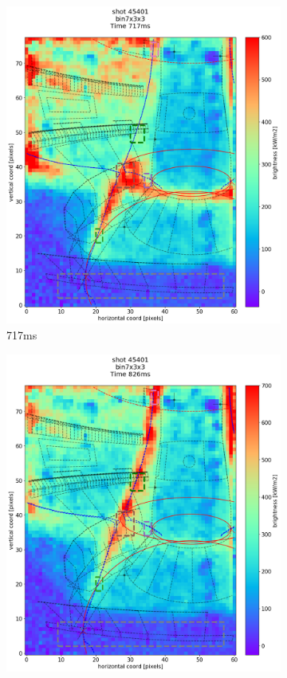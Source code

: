 \begin{figure}[!ht]
\begin{subfigure}{0.355\linewidth}
         \includegraphics[trim={50 0 25 80},clip,width=\textwidth]{Chapters/chapter2/figs/IRVB-MASTU_shot-45401_export_64.png}
         \caption{717ms}
         \label{fig:45401_export_2}
     \end{subfigure}
     \begin{subfigure}{0.34\linewidth}
         \centering
         \includegraphics[trim={50 25 25 80},clip,width=\textwidth]{Chapters/chapter2/figs/IRVB-MASTU_shot-45401_export_65.png}

\end{subfigure}
\end{figure}

